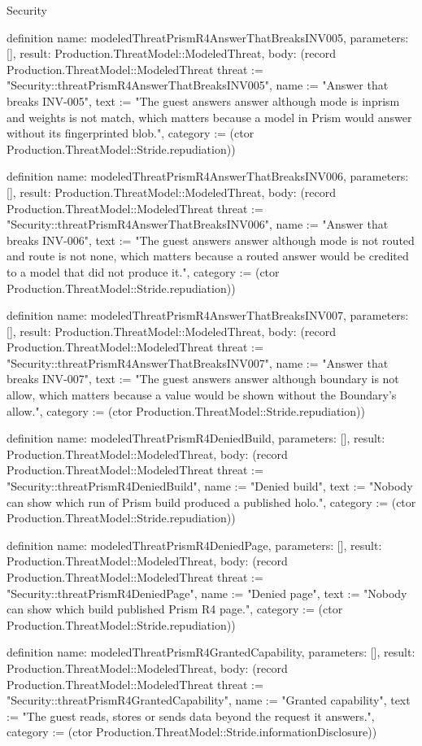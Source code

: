 \begin{lexlean}{Security}
\begin{semanticmodule}
definition{
  name: modeledThreatPrismR4AnswerThatBreaksINV005,
  parameters: [],
  result: Production.ThreatModel::ModeledThreat,
  body: (record Production.ThreatModel::ModeledThreat {threat := "Security::threatPrismR4AnswerThatBreaksINV005", name := "Answer that breaks INV-005", text := "The guest answers answer although mode is inprism and weights is not match, which matters because a model in Prism would answer without its fingerprinted blob.", category := (ctor Production.ThreatModel::Stride.repudiation)})
}

definition{
  name: modeledThreatPrismR4AnswerThatBreaksINV006,
  parameters: [],
  result: Production.ThreatModel::ModeledThreat,
  body: (record Production.ThreatModel::ModeledThreat {threat := "Security::threatPrismR4AnswerThatBreaksINV006", name := "Answer that breaks INV-006", text := "The guest answers answer although mode is not routed and route is not none, which matters because a routed answer would be credited to a model that did not produce it.", category := (ctor Production.ThreatModel::Stride.repudiation)})
}

definition{
  name: modeledThreatPrismR4AnswerThatBreaksINV007,
  parameters: [],
  result: Production.ThreatModel::ModeledThreat,
  body: (record Production.ThreatModel::ModeledThreat {threat := "Security::threatPrismR4AnswerThatBreaksINV007", name := "Answer that breaks INV-007", text := "The guest answers answer although boundary is not allow, which matters because a value would be shown without the Boundary's allow.", category := (ctor Production.ThreatModel::Stride.repudiation)})
}

definition{
  name: modeledThreatPrismR4DeniedBuild,
  parameters: [],
  result: Production.ThreatModel::ModeledThreat,
  body: (record Production.ThreatModel::ModeledThreat {threat := "Security::threatPrismR4DeniedBuild", name := "Denied build", text := "Nobody can show which run of Prism build produced a published holo.", category := (ctor Production.ThreatModel::Stride.repudiation)})
}

definition{
  name: modeledThreatPrismR4DeniedPage,
  parameters: [],
  result: Production.ThreatModel::ModeledThreat,
  body: (record Production.ThreatModel::ModeledThreat {threat := "Security::threatPrismR4DeniedPage", name := "Denied page", text := "Nobody can show which build published Prism R4 page.", category := (ctor Production.ThreatModel::Stride.repudiation)})
}

definition{
  name: modeledThreatPrismR4GrantedCapability,
  parameters: [],
  result: Production.ThreatModel::ModeledThreat,
  body: (record Production.ThreatModel::ModeledThreat {threat := "Security::threatPrismR4GrantedCapability", name := "Granted capability", text := "The guest reads, stores or sends data beyond the request it answers.", category := (ctor Production.ThreatModel::Stride.informationDisclosure)})
}


\end{semanticmodule}
\end{lexlean}
